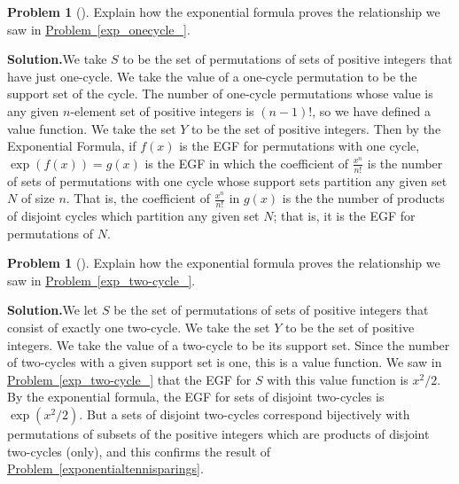 \documentclass[10pt,]{book}
\theoremstyle{plain}
\theoremstyle{definition}
\newtheorem{activity}[project]{Problem}
\theoremstyle{definition}
\numberwithin{equation}{chapter}
\begin{document}
\begin{activity}[]\label{activity-414}
Explain how the exponential formula proves the relationship we saw in \hyperref[exp_onecycle_]{Problem~\ref{exp_onecycle_}}.%
\par\medskip\noindent%
\textbf{Solution.}\quad We take \(S\) to be the set of permutations of sets of positive integers that have just one-cycle. We take the value of a one-cycle permutation to be the support set of the cycle. The number of one-cycle permutations whose value is any given \(n\)-element set of positive integers is \((n-1)!\), so we have defined a value function. We take the set \(Y\) to be the set of positive integers. Then by the Exponential Formula, if \(f(x)\) is the EGF for permutations with one cycle, \(\exp(f(x))=g(x)\) is the EGF in which the coefficient of \(\frac{x^n}{n!}\) is the number of sets of permutations with one cycle whose support sets partition any given set \(N\) of size \(n\). That is, the coefficient of \(\frac{x^n}{n!}\) in \(g(x)\) is the the number of products of disjoint cycles which partition any given set \(N\); that is, it is the EGF for permutations of \(N\).%
\end{activity}
\begin{activity}[]\label{activity-415}
Explain how the exponential formula proves the relationship we saw in \hyperref[exp_two-cycle_]{Problem~\ref{exp_two-cycle_}}.%
\par\medskip\noindent%
\textbf{Solution.}\quad We let \(S\) be the set of permutations of sets of positive integers that consist of exactly one two-cycle. We take the set \(Y\) to be the set of positive integers. We take the value of a two-cycle to be its support set. Since the number of two-cycles with a given support set is one, this is a value function. We saw in \hyperref[exp_two-cycle_]{Problem~\ref{exp_two-cycle_}} that the EGF for \(S\) with this value function is \(x^2/2\). By the exponential formula, the EGF for sets of disjoint two-cycles is \(\exp(x^2/2)\). But a sets of disjoint two-cycles correspond bijectively with permutations of subsets of the positive integers which are products of disjoint two-cycles (only), and this confirms the result of \hyperref[exponentialtennisparings]{Problem~\ref{exponentialtennisparings}}.%
\end{activity}
\end{document}
